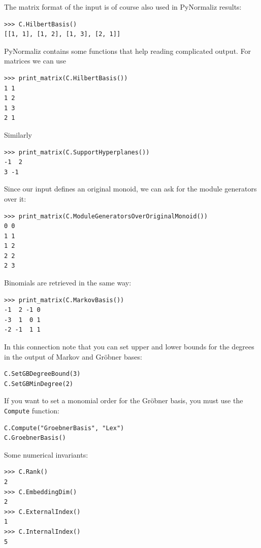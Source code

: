 \begin{small}
The matrix format of the input is of course also used in PyNormaliz results:
\begin{Verbatim}
>>> C.HilbertBasis()
[[1, 1], [1, 2], [1, 3], [2, 1]]
\end{Verbatim}
PyNormaliz contains some functions that help reading complicated output. For matrices we can use
\begin{Verbatim}
>>> print_matrix(C.HilbertBasis())
1 1
1 2
1 3
2 1
\end{Verbatim}
Similarly
\begin{Verbatim}
>>> print_matrix(C.SupportHyperplanes())
-1  2
3 -1
\end{Verbatim}
Since our input defines an original monoid, we can ask for the module generators over it:
\begin{Verbatim}
>>> print_matrix(C.ModuleGeneratorsOverOriginalMonoid())
0 0
1 1
1 2
2 2
2 3
\end{Verbatim}
Binomials are retrieved in the same way:
\begin{Verbatim}
>>> print_matrix(C.MarkovBasis())
-1  2 -1 0
-3  1  0 1
-2 -1  1 1
\end{Verbatim}
In this connection note that you can set upper and lower bounds for the degrees in the output of Markov and Gröbner bases:
\begin{Verbatim}
C.SetGBDegreeBound(3)
C.SetGBMinDegree(2)
\end{Verbatim}
If you want to set a monomial order for the Gröbner basis, you must use the \verb|Compute| function:
\begin{Verbatim}
C.Compute("GroebnerBasis", "Lex")
C.GroebnerBasis()
\end{Verbatim}

Some numerical invariants:
\begin{Verbatim}
>>> C.Rank()
2
>>> C.EmbeddingDim()
2
>>> C.ExternalIndex()
1
>>> C.InternalIndex()
5
\end{Verbatim}


\end{small}
